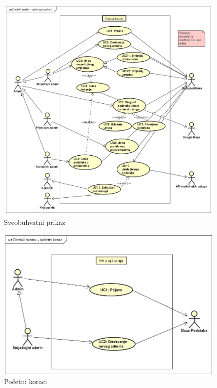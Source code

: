 				\begin{figure}[H]
					\includegraphics[width=\linewidth]{slike/Cjelokupni-prikaz-1.PNG} 
					\centering
					\caption{Sveobuhvatni prikaz}
					\label{fig:sveobuhvatniPrikaz}
				\end{figure}
				
				\begin{figure}[H]
					\includegraphics[width=\linewidth]{slike/DentAll_Pocetni-Koraci.PNG} 
					\centering
					\caption{Početni koraci}
					\label{fig:pocetniKoraci}
				\end{figure}
				
